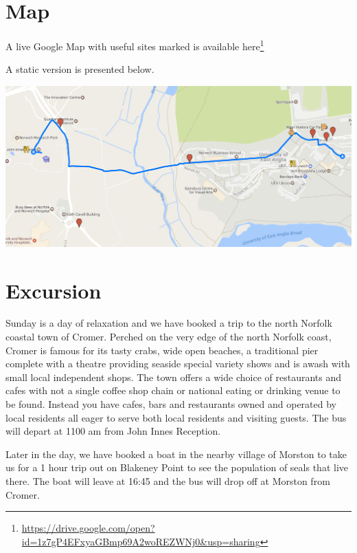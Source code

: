 \documentclass[12pt,]{book}
\let\rmarkdownfootnote\footnote%
\def\footnote{\protect\rmarkdownfootnote}
\renewcommand{\href}[2]{#2\footnote{\url{#1}}}
\begin{document}
\section*{Map}\label{map}

A live Google Map with useful sites marked is available
\href{https://drive.google.com/open?id=1z7gP4EFxyaGBmp69A2woREZWNj0\&usp=sharing}{here}

A static version is presented below.

\includegraphics[width=6.11in]{assets/large_map}

\section*{Excursion}\label{excursion}

Sunday is a day of relaxation and we have booked a trip to the north
Norfolk coastal town of Cromer. Perched on the very edge of the north
Norfolk coast, Cromer is famous for its tasty crabs, wide open beaches,
a traditional pier complete with a theatre providing seaside special
variety shows and is awash with small local independent shops. The town
offers a wide choice of restaurants and cafes with not a single coffee
shop chain or national eating or drinking venue to be found. Instead you
have cafes, bars and restaurants owned and operated by local residents
all eager to serve both local residents and visiting guests. The bus
will depart at 1100 am from John Innes Reception.

Later in the day, we have booked a boat in the nearby village of Morston
to take us for a 1 hour trip out on Blakeney Point to see the population
of seals that live there. The boat will leave at 16:45 and the bus will
drop off at Morston from Cromer.


\end{document}

